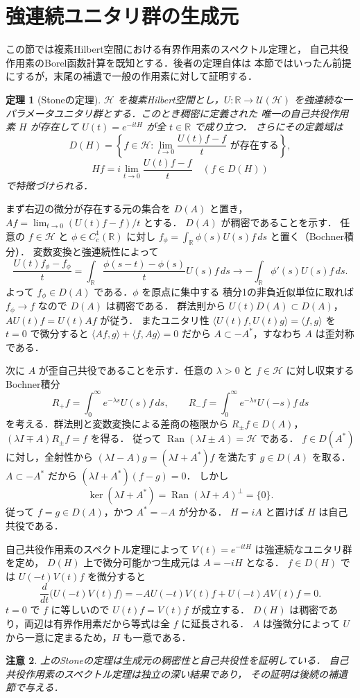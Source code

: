 \documentclass[a5paper,10pt,onecolumn]{jsarticle}
\makeatletter
\theoremstyle{mathnotetheorem}
\newtheorem{theorem}{定理}[section]
\newtheorem{remark}[theorem]{注意}
\renewcommand{\proofname}{証明}
\renewenvironment{proof}[1][\proofname]{%
  \par\pushQED{\qed}\normalfont\topsep4\p@\@plus2\p@\relax
  \trivlist\item[\hskip\labelsep\bfseries #1]\ignorespaces
}{\popQED\endtrivlist\@endpefalse}
\makeatother
\begin{document}
\section{強連続ユニタリ群の生成元}
この節では複素Hilbert空間における有界作用素のスペクトル定理と，
自己共役作用素のBorel函数計算を既知とする．後者の定理自体は
本節ではいったん前提にするが，末尾の補遺で一般の作用素に対して証明する．
\begin{theorem}[Stoneの定理]\label{thm:stone}
$\mathcal H$ を複素Hilbert空間とし，$U:\mathbb R\to\mathcal U(\mathcal H)$
を強連続な一パラメータユニタリ群とする．このとき稠密に定義された
唯一の自己共役作用素 $H$ が存在して
$U(t)=e^{-itH}$ が全 $t\in\mathbb R$ で成り立つ．
さらにその定義域は
\[
 D(H)=\left\{f\in\mathcal H:
 \lim_{t\to0}\frac{U(t)f-f}{t}\text{ が存在する}\right\},
\]
\[
 Hf=i\lim_{t\to0}\frac{U(t)f-f}{t}\quad(f\in D(H))
\]
で特徴づけられる．
\end{theorem}
\begin{proof}
まず右辺の微分が存在する元の集合を $D(A)$ と置き，
$Af=\lim_{t\to0}(U(t)f-f)/t$ とする．
$D(A)$ が稠密であることを示す．
任意の $f\in\mathcal H$ と $\phi\in C_c^1(\mathbb R)$ に対し
$f_\phi=\int_{\mathbb R}\phi(s)U(s)f\,ds$ と置く（Bochner積分）．
変数変換と強連続性によって
\[
 \frac{U(t)f_\phi-f_\phi}{t}
 =\int_{\mathbb R}\frac{\phi(s-t)-\phi(s)}t U(s)f\,ds
 \longrightarrow-\int_{\mathbb R}\phi'(s)U(s)f\,ds.
\]
よって $f_\phi\in D(A)$ である．$\phi$ を原点に集中する
積分1の非負近似単位に取れば $f_\phi\to f$ なので $D(A)$ は稠密である．
群法則から $U(t)D(A)\subset D(A)$，$AU(t)f=U(t)Af$ が従う．
またユニタリ性 $\langle U(t)f,U(t)g\rangle=\langle f,g\rangle$
を $t=0$ で微分すると
$\langle Af,g\rangle+\langle f,Ag\rangle=0$ だから
$A\subset -A^*$，すなわち $A$ は歪対称である．

次に $A$ が歪自己共役であることを示す．任意の $\lambda>0$ と
$f\in\mathcal H$ に対し収束するBochner積分
\[
 R_+f=\int_0^\infty e^{-\lambda s}U(s)f\,ds,
 \qquad R_-f=\int_0^\infty e^{-\lambda s}U(-s)f\,ds
\]
を考える．群法則と変数変換による差商の極限から
$R_\pm f\in D(A)$，$(\lambda I\mp A)R_\pm f=f$ を得る．
従って $\operatorname{Ran}(\lambda I\pm A)=\mathcal H$ である．
$f\in D(A^*)$ に対し，全射性から
$(\lambda I-A)g=(\lambda I+A^*)f$ を満たす $g\in D(A)$ を取る．
$A\subset-A^*$ だから $(\lambda I+A^*)(f-g)=0$．
しかし
\[
 \ker(\lambda I+A^*)=
 \operatorname{Ran}(\lambda I+A)^\perp=\{0\}.
\]
従って $f=g\in D(A)$，かつ $A^*=-A$ が分かる．
$H=iA$ と置けば $H$ は自己共役である．

自己共役作用素のスペクトル定理によって
$V(t)=e^{-itH}$ は強連続なユニタリ群を定め，
$D(H)$ 上で微分可能かつ生成元は $A=-iH$ となる．
$f\in D(H)$ では $U(-t)V(t)f$ を微分すると
\[
 \frac d{dt}\bigl(U(-t)V(t)f\bigr)
 =-AU(-t)V(t)f+U(-t)AV(t)f=0.
\]
$t=0$ で $f$ に等しいので $U(t)f=V(t)f$ が成立する．
$D(H)$ は稠密であり，両辺は有界作用素だから等式は全 $f$ に延長される．
$A$ は強微分によって $U$ から一意に定まるため，$H$ も一意である．
\end{proof}
\begin{remark}
上のStoneの定理は生成元の稠密性と自己共役性を証明している．
自己共役作用素のスペクトル定理は独立の深い結果であり，
その証明は後続の補遺節で与える．
\end{remark}
\end{document}
